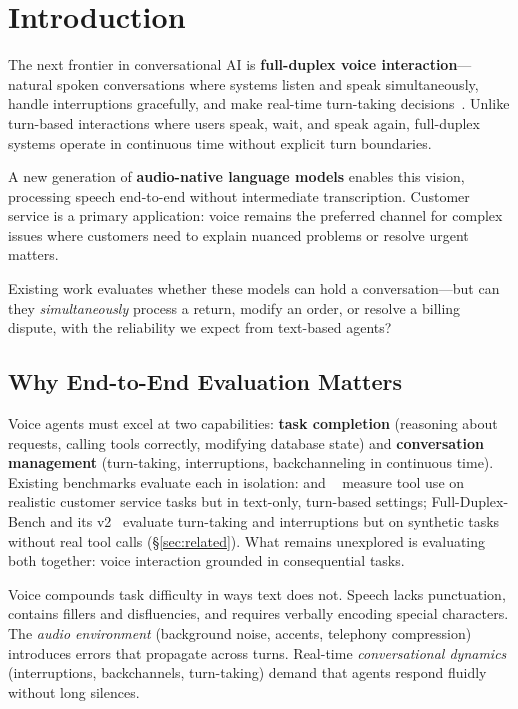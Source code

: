 \section{Introduction}
\label{sec:intro}

The next frontier in conversational AI is \textbf{full-duplex voice interaction}---natural spoken conversations where systems listen and speak simultaneously, handle interruptions gracefully, and make real-time turn-taking decisions~\citep{gartner_conversational_ai_2024, gartner_agentic_ai_2025, moore_ai_voice_2025}. Unlike turn-based interactions where users speak, wait, and speak again, full-duplex systems operate in continuous time without explicit turn boundaries.

A new generation of \textbf{audio-native language models} enables this vision, processing speech end-to-end without intermediate transcription. Customer service is a primary application: voice remains the preferred channel for complex issues where customers need to explain nuanced problems or resolve urgent matters.

Existing work evaluates whether these models can hold a conversation---but can they \textit{simultaneously} process a return, modify an order, or resolve a billing dispute, with the reliability we expect from text-based agents?

\subsection{Why End-to-End Evaluation Matters}

Voice agents must excel at two capabilities: \textbf{task completion} (reasoning about requests, calling tools correctly, modifying database state) and \textbf{conversation management} (turn-taking, interruptions, backchanneling in continuous time). Existing benchmarks evaluate each in isolation: \taubench{} and \tautwobench{}~\citep{yao_-bench_2024, barres_2-bench_2025} measure tool use on realistic customer service tasks but in text-only, turn-based settings; Full-Duplex-Bench and its v2~\citep{lin_full-duplex-bench_2025, lin_full-duplex-bench-v2_2025} evaluate turn-taking and interruptions but on synthetic tasks without real tool calls (\S\ref{sec:related}). What remains unexplored is evaluating both together: voice interaction grounded in consequential tasks.

Voice compounds task difficulty in ways text does not. Speech lacks punctuation, contains fillers and disfluencies, and requires verbally encoding special characters. The \textit{audio environment} (background noise, accents, telephony compression) introduces errors that propagate across turns. Real-time \textit{conversational dynamics} (interruptions, backchannels, turn-taking) demand that agents respond fluidly without long silences.

